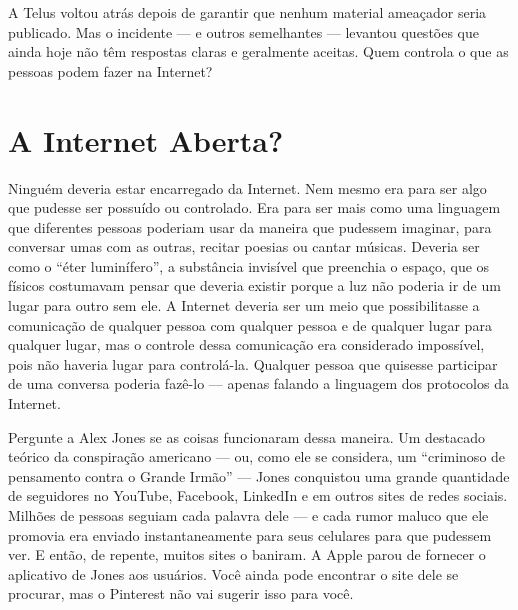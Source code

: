 A Telus voltou atrás depois de garantir que nenhum material ameaçador seria publicado.
Mas o incidente --- e outros semelhantes --- levantou questões que ainda hoje não têm
respostas claras e geralmente aceitas. Quem controla o que as pessoas podem fazer na
Internet?

\section{A Internet Aberta?}
\label{gatekeepers:internet-aberta}

Ninguém deveria estar encarregado da Internet. Nem mesmo era para ser algo que pudesse
ser possuído ou controlado. Era para ser mais como uma linguagem que diferentes pessoas
poderiam usar da maneira que pudessem imaginar, para conversar umas com as outras,
recitar poesias ou cantar músicas. Deveria ser como o ``éter luminífero'', a substância
invisível que preenchia o espaço, que os físicos costumavam pensar que deveria existir
porque a luz não poderia ir de um lugar para outro sem ele. A Internet deveria ser um
meio que possibilitasse a comunicação de qualquer pessoa com qualquer pessoa e de
qualquer lugar para qualquer lugar, mas o controle dessa comunicação era considerado
impossível, pois não haveria lugar para controlá-la. Qualquer pessoa que quisesse
participar de uma conversa poderia fazê-lo --- apenas falando a linguagem dos protocolos
da Internet.

Pergunte a Alex Jones se as coisas funcionaram dessa maneira. Um destacado teórico da
conspiração americano --- ou, como ele se considera, um ``criminoso de pensamento contra
o Grande Irmão'' --- Jones conquistou uma grande quantidade de seguidores no YouTube,
Facebook, LinkedIn e em outros sites de redes sociais. Milhões de pessoas seguiam cada
palavra dele --- e cada rumor maluco que ele promovia era enviado instantaneamente para
seus celulares para que pudessem ver. E então, de repente, muitos sites o baniram. A
Apple parou de fornecer o aplicativo de Jones aos usuários. Você ainda pode encontrar o
site dele se procurar, mas o Pinterest não vai sugerir isso para você.

